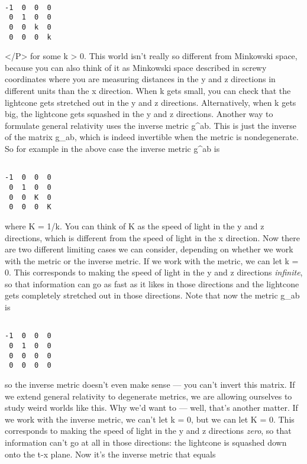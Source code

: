 \begin{verbatim}

-1  0  0  0
 0  1  0  0
 0  0  k  0
 0  0  0  k
\end{verbatim}
    
</P>
for some k > 0.  This world isn't really so different from
Minkowski space, because you can also think of it as Minkowski
space described in screwy coordinates where you are measuring
distances in the y and z directions in different units than the x
direction.   When k gets small, you can check that the lightcone
gets stretched out in the y and z directions.  Alternatively,
when k gets big, the lightcone gets squashed in the y and z
directions.  
Another way to formulate general relativity uses the inverse
metric g^{ab}.  This is just the inverse of the matrix g_{ab},
which is indeed invertible when the metric is nondegenerate.
So for example in the above case the inverse metric g^{ab} is

\begin{verbatim}

-1  0  0  0
 0  1  0  0
 0  0  K  0
 0  0  0  K
\end{verbatim}
    
where K = 1/k.  You can think of K as the speed of light in the
y and z directions, which is different from the speed of light in
the x direction.  
Now there are two different limiting cases we can consider,
depending on whether we work with the metric or the inverse
metric.  If we work with the metric, we can let k = 0.  This
corresponds to making the speed of light in the y and z
directions \emph{infinite}, so that information can go as fast as it
likes in those directions and the lightcone gets completely
stretched out in those directions.   Note that now the metric
g_{ab} is

\begin{verbatim}

-1  0  0  0
 0  1  0  0
 0  0  0  0
 0  0  0  0
\end{verbatim}
    
so the inverse metric doesn't even make sense --- you can't
invert this matrix.  If we extend general relativity to
degenerate metrics, we are allowing ourselves to study weird
worlds like this.  Why we'd want to --- well, that's another
matter.
If we work with the inverse metric, we can't let k = 0, but we
can let K = 0.  This corresponds to making the speed of light in
the y and z directions \emph{zero}, so that information can't go at
all in those directions: the lightcone is squashed down onto the
t-x plane.   Now it's the inverse metric that equals

